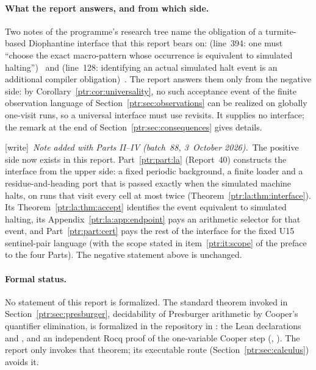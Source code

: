 \documentclass[11pt,letterpaper]{article}
\theoremstyle{definition}\newtheorem{definition}[theorem]{Definition}
\theoremstyle{remark}\newtheorem{remark}[theorem]{Remark}
\newcommand{\wtag}{\textup{[write]}}
\newcommand{\bnote}{\wtag\ \emph{Note added with Parts II--IV (batch~88, 3~October 2026).}}
\begin{document}
\paragraph{What the report answers, and from which side.} Two notes of the
programme's research tree name the obligation of a turmite-based
Diophantine interface that this report bears on:
(line~394: one must ``choose the exact macro-pattern whose occurrence is
equivalent to simulated halting'')~\cite{antnote} and
(line~128: identifying an actual simulated halt event is an additional
compiler obligation)~\cite{togglenote}. The report answers them only from
the negative side: by Corollary~\ref{ptr:cor:universality}, no such
acceptance event of the finite observation language of
Section~\ref{ptr:sec:observations} can be realized on globally one-visit
runs, so a universal interface must use revisits. It supplies no interface;
the remark at the end of Section~\ref{ptr:sec:consequences} gives details.

{\small\bnote\ The positive side now exists in this report. Part~\ref{ptr:part:la}
(Report~40) constructs the interface from the upper side: a fixed periodic
background, a finite loader and a residue-and-heading port that is passed
exactly when the simulated machine halts, on runs that visit every cell at
most twice (Theorem~\ref{ptr:la:thm:interface}). Its
Theorem~\ref{ptr:la:thm:accept} identifies the event equivalent to simulated
halting, its Appendix~\ref{ptr:la:app:endpoint} pays an arithmetic selector
for that event, and Part~\ref{ptr:part:cert} pays the rest of the interface
for the fixed U15 sentinel-pair language (with the scope stated in item~\ref{ptr:it:scope}
of the preface to the four Parts). The negative statement
above is unchanged.\par}

\paragraph{Formal status.} No statement of this report is formalized. The
standard theorem invoked in Section~\ref{ptr:sec:presburger}, decidability
of Presburger arithmetic by Cooper's quantifier elimination, is formalized
in the repository in : the Lean
declarations 
and , and an
independent Rocq proof of the one-variable Cooper step
(, ). The report
only invokes that theorem; its executable route
(Section~\ref{ptr:sec:calculus}) avoids it.
\end{document}
